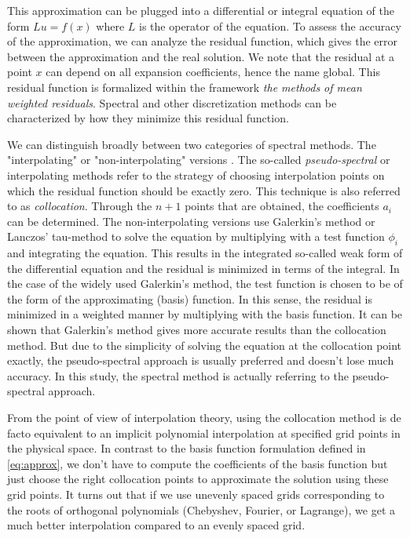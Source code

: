 This approximation can be plugged into a differential or integral equation of
the form $Lu=f(x)$ where $L$ is the operator of the equation. To assess the
accuracy of the approximation, we can analyze the residual function, which
gives the error between the approximation and the real solution. We note that
the residual at a point $x$ can depend on all expansion coefficients, hence the
name global. This residual function is formalized within the framework
\emph{the methods of mean weighted residuals}. Spectral and other
discretization methods can be characterized by how they minimize this residual
function. 

We can distinguish broadly between two categories of spectral methods. The
"interpolating" or "non-interpolating" versions \citep{boyd2001}. The so-called
\emph{pseudo-spectral} or interpolating methods refer to the strategy of
choosing interpolation points on which the residual function should be exactly
zero. This technique is also referred to as \emph{collocation}. Through the
$n+1$ points that are obtained, the coefficients $a_i$ can be determined. The
non-interpolating versions use Galerkin's method or Lanczos' tau-method to
solve the equation by multiplying with a test function $\phi_i$ and integrating
the equation. This results in the integrated so-called weak form of the
differential equation and the residual is minimized in terms of the integral.
In the case of the widely used Galerkin's method, the test function is chosen
to be of the form of the approximating (basis) function. In this sense, the
residual is minimized in a weighted manner by multiplying with the basis
function. It can be shown that Galerkin's method gives more accurate results
than the collocation method. But due to the simplicity of solving the equation
at the collocation point exactly, the pseudo-spectral approach is usually
preferred and doesn't lose much accuracy. In this study, the spectral method is
actually referring to the pseudo-spectral approach.

From the point of view of interpolation theory, using the collocation method is
de facto equivalent to an implicit polynomial interpolation at specified grid
points in the physical space. In contrast to the basis function formulation
defined in \eqref{eq:approx}, we don't have to compute the coefficients of the
basis function but just choose the right collocation points to approximate the
solution using these grid points. It turns out that if we use unevenly spaced
grids corresponding to the roots of orthogonal polynomials (Chebyshev, Fourier,
or Lagrange), we get a much better interpolation compared to an evenly spaced
grid.

